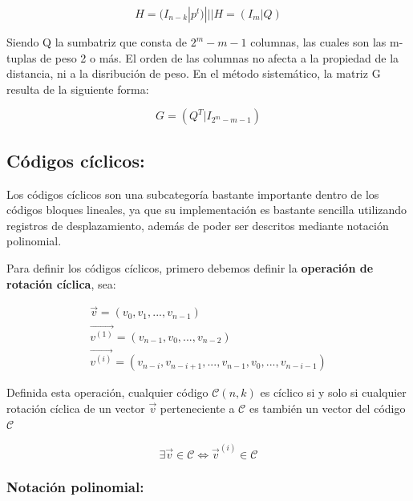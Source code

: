 \documentclass{article}
\begin{document}
\begin{equation}
    H=(I_{n-k}|p^t) ||| H=(I_m|Q)
\end{equation}

Siendo Q la sumbatriz que consta de $2^m-m-1$ columnas, las cuales son las m-tuplas de peso 2 o más. El orden de las columnas no afecta a la propiedad de la distancia, ni a la disribución de peso. En el método sistemático, la matriz G resulta de la siguiente forma:

\begin{equation}
    G=(Q^T|I_{2^m-m-1})
\end{equation}

\pagebreak
\subsection{Códigos cíclicos:}

Los códigos cíclicos son una subcategoría bastante importante dentro de los códigos bloques lineales, ya que su implementación es bastante sencilla utilizando registros de desplazamiento, además de poder ser descritos mediante notación polinomial.

Para definir los códigos cíclicos, primero debemos definir la \textbf{operación de rotación cíclica}, sea:

\begin{equation}
    \begin{array}{c}
        \vec{v} = (v_0, v_1, ..., v_{n-1}) \\
        \vec{v^{(1)}} = (v_{n-1}, v_0, ..., v_{n-2}) \\
        \vec{v^{(i)}} = (v_{n-i}, v_{n-i+1}, ... , v_{n-1}, v_{0}, ..., v_{n-i-1})
    \end{array}
\end{equation}

Definida esta operación, cualquier código $\mathcal{C}(n,k)$ es cíclico si y solo si cualquier rotación cíclica de un vector $\vec{v}$ perteneciente a $\mathcal{C}$ es también un vector del código $\mathcal{C}$

\begin{equation}
    \exists \vec{v} \in \mathcal{C} \Leftrightarrow \vec{v}^{(i)}\in \mathcal{C}
\end{equation}

\subsubsection{Notación polinomial:}
\end{document}
